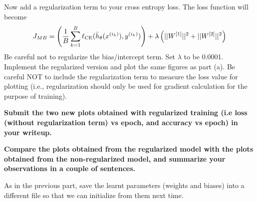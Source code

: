 \item {} Now add a regularization term to your cross entropy loss.
The loss function will become \begin{equation*}
  J_{MB} = \left(\frac{1}{B}\sum_{k=1}^B \ell_\textup{CE}(\bar{h}_{\theta}(x^{(i_k)}),y^{(i_k)})\right)
 + \lambda \left(||W^{[1]}||^2 + ||W^{[2]}||^2 \right)
  \end{equation*}
Be careful not to regularize the bias/intercept term.
Set $\lambda$ to be 0.0001. Implement the regularized version and plot the same
figures as part (a). Be careful NOT to include the regularization term to measure
the loss value for plotting (i.e., regularization should only be used for gradient calculation for
the purpose of training).

\textbf{Submit the two new plots obtained with regularized training (i.e loss (without regularization term) vs epoch, and accuracy vs epoch) in your writeup.}

\textbf{Compare the plots obtained from the regularized model with the plots obtained
from the non-regularized model, and summarize your observations in a couple of sentences.}

As in the previous part, save the learnt parameters (weights and biases) into a
different file so that we can initialize from them next time.

